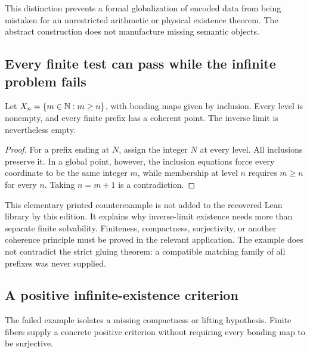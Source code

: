 This distinction prevents a formal globalization of encoded data from being mistaken for an unrestricted arithmetic or physical existence theorem. The abstract construction does not manufacture missing semantic objects.

\subsection{Every finite test can pass while the infinite problem fails}
\begin{example}\label{KS54}
Let \(X_n=\{m\in\mathbb N:m\ge n\}\), with bonding maps given by inclusion. Every level is nonempty, and every finite prefix has a coherent point. The inverse limit is nevertheless empty.
\end{example}
\begin{proof}
For a prefix ending at \(N\), assign the integer \(N\) at every level. All inclusions preserve it. In a global point, however, the inclusion equations force every coordinate to be the same integer \(m\), while membership at level \(n\) requires \(m\ge n\) for every \(n\). Taking \(n=m+1\) is a contradiction.
\end{proof}
This elementary printed counterexample is not added to the recovered Lean library by this edition. It explains why inverse-limit existence needs more than separate finite solvability. Finiteness, compactness, surjectivity, or another coherence principle must be proved in the relevant application. The example does not contradict the strict gluing theorem: a compatible matching family of all prefixes was never supplied.

\subsection{A positive infinite-existence criterion}
The failed example isolates a missing compactness or lifting hypothesis. Finite fibers supply a concrete positive criterion without requiring every bonding map to be surjective.

